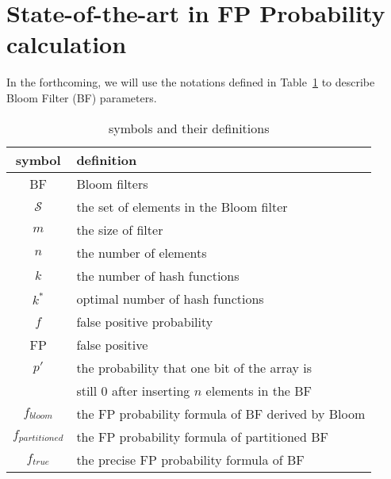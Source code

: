 \presec
\section{State-of-the-art in FP Probability calculation} \postsec
\label{sec:priorarts}
In the forthcoming, we will use the notations defined in Table~\ref{table:symbols} to describe Bloom Filter (BF) parameters.

\begin{table} [htbp]
\vspace{-0.15in}
\caption{symbols and their definitions}
\centering
\label{table:symbols}
\begin{tabular}{| c | l |}
\hline symbol & definition \\
\hline 
       BF   & Bloom filters \\
\hline $\mathcal{S}$ & the set of elements in the Bloom filter \\
\hline $m$  & the size of filter \\
\hline $n$  & the number of elements \\
\hline $k$  & the number of hash functions \\
\hline $k^*$  & optimal number of hash functions \\
\hline $f$  & false positive probability \\
\hline FP   & false positive \\
\hline $p'$ & the probability that one bit of the array is \\
            & still 0 after inserting $n$ elements in the BF \\
\hline $f_{bloom}$ & the FP probability formula of BF derived by Bloom \\
\hline $f_{partitioned}$ & the FP probability formula of partitioned BF \\
\hline $f_{true}$        & the precise FP probability formula of BF\\
\hline
\end{tabular}
\end{table}

